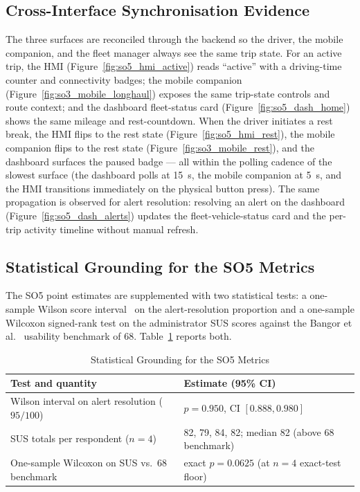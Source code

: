 \subsection{Cross-Interface Synchronisation Evidence}
The three surfaces are reconciled through the backend so the driver, the mobile companion, and the fleet manager always see the same trip state. For an active trip, the HMI (Figure~\ref{fig:so5_hmi_active}) reads ``active'' with a driving-time counter and connectivity badges; the mobile companion (Figure~\ref{fig:so3_mobile_longhaul}) exposes the same trip-state controls and route context; and the dashboard fleet-status card (Figure~\ref{fig:so5_dash_home}) shows the same mileage and rest-countdown. When the driver initiates a rest break, the HMI flips to the rest state (Figure~\ref{fig:so5_hmi_rest}), the mobile companion flips to the rest state (Figure~\ref{fig:so3_mobile_rest}), and the dashboard surfaces the paused badge --- all within the polling cadence of the slowest surface (the dashboard polls at 15~s, the mobile companion at 5~s, and the HMI transitions immediately on the physical button press). The same propagation is observed for alert resolution: resolving an alert on the dashboard (Figure~\ref{fig:so5_dash_alerts}) updates the fleet-vehicle-status card and the per-trip activity timeline without manual refresh.

\FloatBarrier
\subsection{Statistical Grounding for the SO5 Metrics}
\label{sec:so5_stats}

The SO5 point estimates are supplemented with two statistical tests: a one-sample Wilson score interval~\cite{wilson1927probable} on the alert-resolution proportion and a one-sample Wilcoxon signed-rank test on the administrator SUS scores against the Bangor et al.~\cite{bangor2009sus} usability benchmark of $68$. Table~\ref{tab:so5_stats} reports both.

\begin{table}[!htbp]
\centering
\caption{Statistical Grounding for the SO5 Metrics}
\label{tab:so5_stats}
\small
\begin{tabular}{|p{}|p{}|}
\hline
\textbf{Test and quantity} & \textbf{Estimate (95\% CI)} \\
\hline
Wilson interval on alert resolution ($95/100$) & $\hat{p} = 0.950$, CI $[0.888, 0.980]$ \\
\hline
SUS totals per respondent ($n=4$) & 82, 79, 84, 82; median 82 (above 68 benchmark) \\
\hline
One-sample Wilcoxon on SUS vs.~68 benchmark & exact $p = 0.0625$ (at $n=4$ exact-test floor) \\
\hline
\end{tabular}
\end{table}

